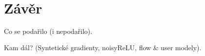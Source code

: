 \chapter*{Závěr}

Co se podařilo (i nepodařilo).

Kam dál? (Syntetické gradienty, noisyReLU, flow \& user modely).
